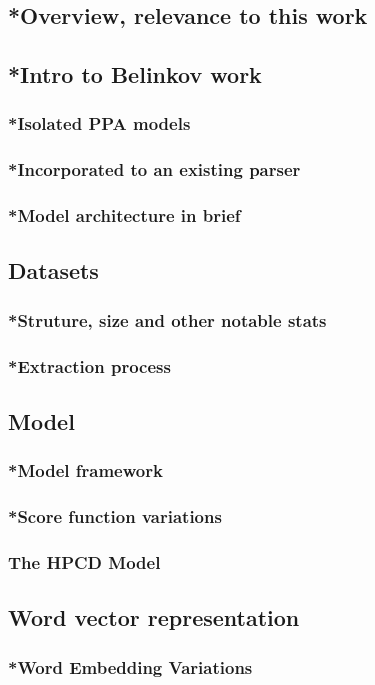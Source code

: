 \subsection{*Overview, relevance to this work}
\subsection{*Intro to Belinkov work}
\subsubsection{*Isolated PPA models}
\subsubsection{*Incorporated to an existing parser}
\subsubsection{*Model architecture in brief}
\subsection{Datasets}
\subsubsection{*Struture, size and other notable stats}
\subsubsection{*Extraction process}
\subsection{Model}
\subsubsection{*Model framework}
\subsubsection{*Score function variations}
\subsubsection{The HPCD Model}
\subsection{Word vector representation}
\subsubsection{*Word Embedding Variations}

